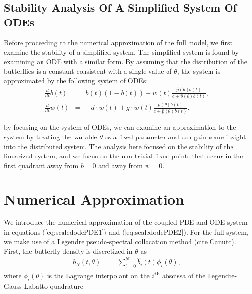 \documentclass[12pt]{article}
\begin{document}
\subsection{Stability Analysis Of A Simplified System Of ODEs}

Before proceeding to the numerical approximation of the full model, we
first examine the stability of a simplified system. The simplified
system is found by examining an ODE with a similar form. By assuming
that the distribution of the butterflies is a constant consistent with
a single value of $\theta$, the system is approximated by the
following system of ODEs:
\begin{eqnarray}
  \label{eq:scaledODE1}
  \frac{d}{dt} b(t) & = &
      b(t) (1 - b(t))
      -  w(t) \frac{\hat{p}(\theta) b(t)}{c+\hat{p}(\theta)b(t)}, \\
  \label{eq:scaledODE2}
  \frac{d}{dt} w(t) & = & -d \cdot w(t) +
       g \cdot w(t) \frac{\hat{p}(\theta) b(t) }{c + \hat{p}(\theta) b(t)}.
\end{eqnarray}

by focusing on the system of ODEs, we can examine an approximation to
the system by treating the variable $\theta$ as a fixed parameter and
can gain some insight into the distributed system. The analysis here
focused on the stability of the linearized system, and we focus on the
non-trivial fixed points that occur in the first quadrant away from
$b=0$ and away from $w=0$.

\section{Numerical Approximation}

We introduce the numerical approximation of the coupled PDE and ODE
system in equations (\ref{eq:scaledodePDE1}) and
(\ref{eq:scaledodePDE2}). For the full system, we make use of a Legendre
pseudo-spectral collocation method (cite Canuto). First, the
butterfly density is discretized in $\theta$ as
\begin{eqnarray}
  \label{eqn:spatialDiscretization}
  b_N(t,\theta) & = & \sum^N_{i=0} \hat{b}_i(t) \phi_i(\theta),
\end{eqnarray}
where $\phi_i(\theta)$ is the Lagrange interpolant on the
$i$\textsuperscript{th} abscissa of the Legendre-Gauss-Labatto
quadrature.
\end{document}

